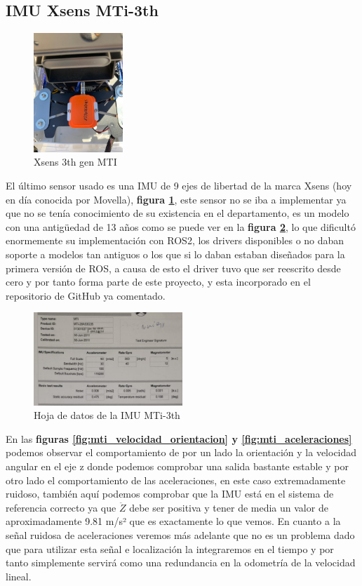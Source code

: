 \subsection{IMU Xsens MTi-3th}
\begin{figure}[H]
    \centering
    \includegraphics[width=0.3\textwidth]{images/xsens.jpeg}
    \caption{Xsens 3th gen MTI}
    \label{fig:xsens_imu}
\end{figure}
El último sensor usado es una IMU de 9 ejes de libertad de la marca Xsens (hoy en día conocida por Movella), 
\textbf{figura \ref{fig:xsens_imu}}, este sensor no se iba a implementar ya que no se tenía conocimiento de su existencia en el 
departamento, es un modelo con una antigüedad de 13 años como se puede ver en la \textbf{figura \ref{fig:xsens_datasheet}}, lo que dificultó enormemente su implementación con ROS2, los drivers 
disponibles o no daban soporte a modelos tan antiguos o los que si lo daban estaban diseñados para la primera versión de ROS, a causa de 
esto el driver tuvo que ser reescrito desde cero y por tanto forma parte de este proyecto, y esta incorporado en el repositorio de GitHub 
ya comentado.  


\begin{figure}[H]
    \centering
    \includegraphics[width=0.5\textwidth]{images/datasheet_mti.png}
    \caption{Hoja de datos de la IMU MTi-3th}
    \label{fig:xsens_datasheet}
\end{figure}
En las \textbf{figuras \ref{fig:mti_velocidad_orientacion} y \ref{fig:mti_aceleraciones}} podemos observar el comportamiento de por un lado 
la orientación y la velocidad angular en el eje z donde podemos comprobar una salida bastante estable y por otro lado el comportamiento 
de las aceleraciones, en este caso extremadamente ruidoso, también aquí podemos comprobar que la IMU está en el sistema de referencia correcto 
ya que \begin{math}\ddot{Z}\end{math} debe ser positiva y tener de media un valor de aproximadamente 9.81 m/s² que es exactamente lo que vemos. En cuanto a la 
señal ruidosa de aceleraciones veremos más adelante que no es un problema dado que para utilizar esta señal e localización la integraremos en el tiempo 
y por tanto simplemente servirá como una redundancia en la odometría de la velocidad lineal.


